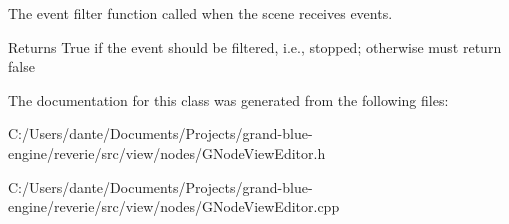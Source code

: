 The event filter function called when the scene receives events. 

\begin{DoxyReturn}{Returns}
True if the event should be filtered, i.\+e., stopped; otherwise must return false 
\end{DoxyReturn}


The documentation for this class was generated from the following files\+:\begin{DoxyCompactItemize}
\item 
C\+:/\+Users/dante/\+Documents/\+Projects/grand-\/blue-\/engine/reverie/src/view/nodes/G\+Node\+View\+Editor.\+h\item 
C\+:/\+Users/dante/\+Documents/\+Projects/grand-\/blue-\/engine/reverie/src/view/nodes/G\+Node\+View\+Editor.\+cpp\end{DoxyCompactItemize}
